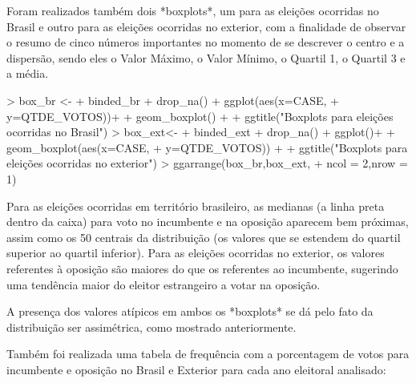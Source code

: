 \documentclass{article}
\begin{document}
Foram realizados também dois *boxplots*, um para as eleições ocorridas no Brasil e outro para as eleições ocorridas no exterior, com a finalidade de observar o resumo de cinco números importantes no momento de se descrever o centro e a dispersão, sendo eles o Valor Máximo, o Valor Mínimo, o Quartil 1, o Quartil 3 e a média.

\begin{Schunk}
\begin{Sinput}
> box_br <-
+ binded_br %>%
+   drop_na() %>%
+   ggplot(aes(x=CASE,
+              y=QTDE_VOTOS))+
+   geom_boxplot() +
+   ggtitle("Boxplots para eleições ocorridas no Brasil")
> box_ext<-
+ binded_ext %>%
+   drop_na() %>%
+   ggplot()+
+   geom_boxplot(aes(x=CASE,
+                    y=QTDE_VOTOS)) + 
+   ggtitle("Boxplots para eleições ocorridas no exterior")
> ggarrange(box_br,box_ext,
+           ncol = 2,nrow = 1)
\end{Sinput}
\end{Schunk}

Para as eleições ocorridas em território brasileiro, as medianas (a linha preta dentro da caixa) para voto no incumbente e na oposição aparecem bem próximas, assim como os 50 centrais da distribuição (os valores que se estendem do quartil superior ao quartil inferior). Para as eleições ocorridas no exterior, os valores referentes à oposição são maiores do que os referentes ao incumbente, sugerindo uma tendência maior do eleitor estrangeiro a votar na oposição.

A presença dos valores atípicos em ambos os *boxplots* se dá pelo fato da distribuição ser assimétrica, como mostrado anteriormente.

Também foi realizada uma tabela de frequência com a porcentagem de votos para incumbente e oposição no Brasil e Exterior para cada ano eleitoral analisado: 
\end{document}
